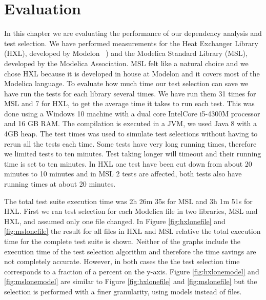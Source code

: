 \documentclass{cslthse-msc}
\begin{document}
\chapter[Evaluation]{Evaluation}
In this chapter we are evaluating the performance of our dependency analysis and test selection. We have performed measurements for the Heat Exchanger Library (HXL), developed by Modelon ~\cite{modelon.comHXL}) and the Modelica Standard Library (MSL), developed by the Modelica Association. MSL felt like a natural choice and we chose HXL because it is developed in house at Modelon and it covers most of the Modelica language. To evaluate how much time our test selection can save we have run the tests for each library several times. We have run them 31 times for MSL and 7 for HXL, to get the average time it takes to run each test. This was done using a Windows 10 machine with a dual core Intel\textregistered Core \texttrademark i5-4300M processor and 16 GB RAM. The compilation is executed in a JVM, we used Java 8 with a 4GB heap. The test times was used to simulate test selections without having to rerun all the tests each time. Some tests have very long running times, therefore we limited tests to ten minutes. Test taking longer will timeout and their running time is set to ten minutes. In HXL one test have been cut down from about 20 minutes to 10 minutes and in MSL 2 tests are affected, both tests also have running times at about 20 minutes. 

The total test suite execution time was 2h 26m 35s for MSL and 3h 1m 51s for HXL. First we ran test selection for each Modelica file in two libraries, MSL and HXL, and assumed only one file changed. In Figure \ref{fig:hxlonefile} and \ref{fig:mslonefile} the result for all files in HXL and MSL relative the total execution time for the complete test suite is shown. Neither of the graphs include the execution time of the test selection algorithm and therefore the time savings are not completely accurate. However, in both cases the the test selection time corresponds to a fraction of a percent on the y-axis. Figure \ref{fig:hxlonemodel} and \ref{fig:mslonemodel} are similar to Figure \ref{fig:hxlonefile} and \ref{fig:mslonefile} but the selection is performed with a finer granularity, using models instead of files. 
\end{document}
